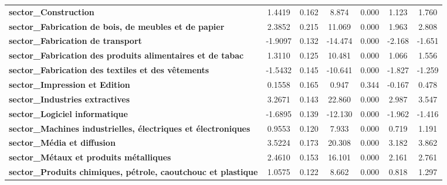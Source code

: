 \begin{center}
\begin{tabular}{lcccccc}
\textbf{sector\_Construction}                                         &       1.4419  &        0.162     &     8.874  &         0.000        &        1.123    &        1.760     \\
\textbf{sector\_Fabrication de bois, de meubles et de papier}         &       2.3852  &        0.215     &    11.069  &         0.000        &        1.963    &        2.808     \\
\textbf{sector\_Fabrication de transport}                             &      -1.9097  &        0.132     &   -14.474  &         0.000        &       -2.168    &       -1.651     \\
\textbf{sector\_Fabrication des produits alimentaires et de tabac}    &       1.3110  &        0.125     &    10.481  &         0.000        &        1.066    &        1.556     \\
\textbf{sector\_Fabrication des textiles et des vêtements}            &      -1.5432  &        0.145     &   -10.641  &         0.000        &       -1.827    &       -1.259     \\
\textbf{sector\_Impression et Edition}                                &       0.1558  &        0.165     &     0.947  &         0.344        &       -0.167    &        0.478     \\
\textbf{sector\_Industries extractives}                               &       3.2671  &        0.143     &    22.860  &         0.000        &        2.987    &        3.547     \\
\textbf{sector\_Logiciel informatique}                                &      -1.6895  &        0.139     &   -12.130  &         0.000        &       -1.962    &       -1.416     \\
\textbf{sector\_Machines industrielles, électriques et électroniques} &       0.9553  &        0.120     &     7.933  &         0.000        &        0.719    &        1.191     \\
\textbf{sector\_Média et diffusion}                                   &       3.5224  &        0.173     &    20.308  &         0.000        &        3.182    &        3.862     \\
\textbf{sector\_Métaux et produits métalliques}                       &       2.4610  &        0.153     &    16.101  &         0.000        &        2.161    &        2.761     \\
\textbf{sector\_Produits chimiques, pétrole, caoutchouc et plastique} &       1.0575  &        0.122     &     8.662  &         0.000        &        0.818    &        1.297     \\

\end{tabular}
\end{center}
